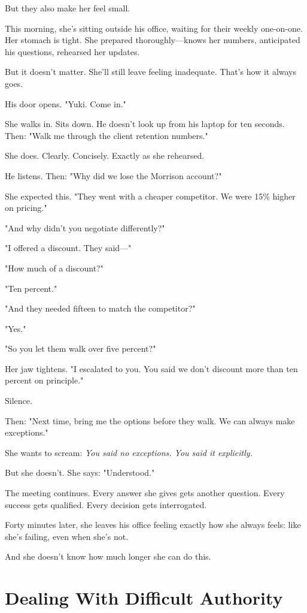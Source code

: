 \documentclass[11pt,twoside]{book}
\begin{document}
But they also make her feel small.

This morning, she's sitting outside his office, waiting for their weekly one-on-one. Her stomach is tight. She prepared thoroughly—knows her numbers, anticipated his questions, rehearsed her updates.

But it doesn't matter. She'll still leave feeling inadequate. That's how it always goes.

His door opens. "Yuki. Come in."

She walks in. Sits down. He doesn't look up from his laptop for ten seconds. Then: "Walk me through the client retention numbers."

She does. Clearly. Concisely. Exactly as she rehearsed.

He listens. Then: "Why did we lose the Morrison account?"

She expected this. "They went with a cheaper competitor. We were 15\% higher on pricing."

"And why didn't you negotiate differently?"

"I offered a discount. They said—"

"How much of a discount?"

"Ten percent."

"And they needed fifteen to match the competitor?"

"Yes."

"So you let them walk over five percent?"

Her jaw tightens. "I escalated to you. You said we don't discount more than ten percent on principle."

Silence.

Then: "Next time, bring me the options before they walk. We can always make exceptions."

She wants to scream: \emph{You said no exceptions. You said it explicitly.}

But she doesn't. She says: "Understood."

The meeting continues. Every answer she gives gets another question. Every success gets qualified. Every decision gets interrogated.

Forty minutes later, she leaves his office feeling exactly how she always feels: like she's failing, even when she's not.

And she doesn't know how much longer she can do this.

\section*{Dealing With Difficult Authority}
\end{document}
